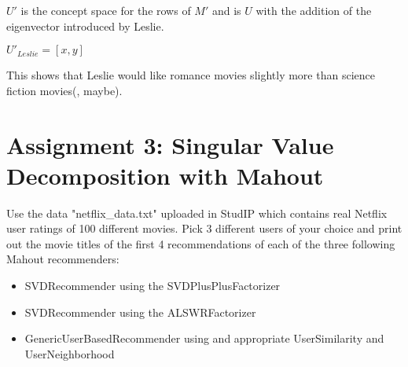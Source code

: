 \documentclass{article}
\begin{document}
$U'$ is the concept space for the rows of $M'$ and is $U$ with the addition of the eigenvector introduced by Leslie.

$U'_{Leslie} = [x,y]$

This shows that Leslie would like romance movies slightly more than science fiction movies(, maybe).

\section{Assignment 3: Singular Value Decomposition with Mahout}
Use the data "netflix\_data.txt" uploaded in StudIP which contains real Netflix user ratings of 100 different movies. Pick 3 different users of your choice and print out the movie titles of the first 4 recommendations of each of the three following Mahout recommenders:
\begin{itemize}
	\item SVDRecommender using the SVDPlusPlusFactorizer
	\item SVDRecommender using the ALSWRFactorizer
	\item GenericUserBasedRecommender using and appropriate UserSimilarity and UserNeighborhood
\end{itemize}
\end{document}
